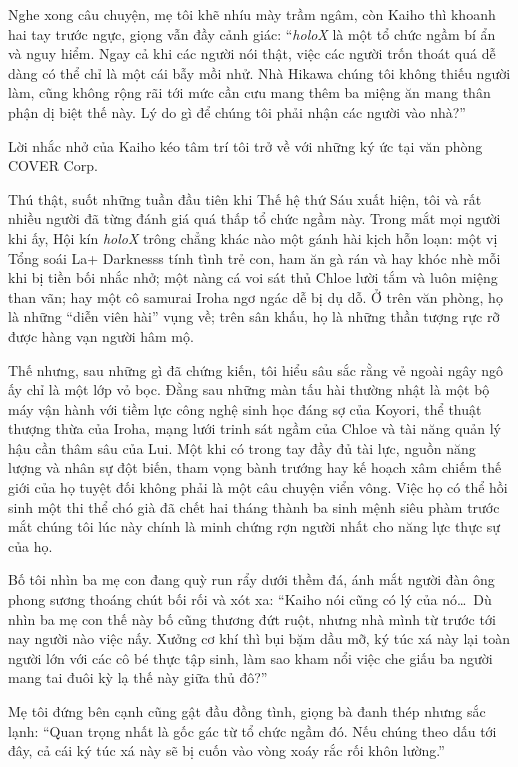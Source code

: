 \documentclass[../main.tex]{subfiles}
\begin{document}
Nghe xong câu chuyện, mẹ tôi khẽ nhíu mày trầm ngâm, còn Kaiho thì khoanh hai tay trước ngực, giọng vẫn đầy cảnh giác: ``\textit{holoX} là một tổ chức ngầm bí ẩn và nguy hiểm. Ngay cả khi các người nói thật, việc các người trốn thoát quá dễ dàng có thể chỉ là một cái bẫy mồi nhử. Nhà Hikawa chúng tôi không thiếu người làm, cũng không rộng rãi tới mức cần cưu mang thêm ba miệng ăn mang thân phận dị biệt thế này. Lý do gì để chúng tôi phải nhận các người vào nhà?''

Lời nhắc nhở của Kaiho kéo tâm trí tôi trở về với những ký ức tại văn phòng COVER Corp.

Thú thật, suốt những tuần đầu tiên khi Thế hệ thứ Sáu xuất hiện, tôi và rất nhiều người đã từng đánh giá quá thấp tổ chức ngầm này. Trong mắt mọi người khi ấy, Hội kín \textit{holoX} trông chẳng khác nào một gánh hài kịch hỗn loạn: một vị Tổng soái La+ Darknesss tính tình trẻ con, ham ăn gà rán và hay khóc nhè mỗi khi bị tiền bối nhắc nhở; một nàng cá voi sát thủ Chloe lười tắm và luôn miệng than vãn; hay một cô samurai Iroha ngơ ngác dễ bị dụ dỗ. Ở trên văn phòng, họ là những ``diễn viên hài'' vụng về; trên sân khấu, họ là những thần tượng rực rỡ được hàng vạn người hâm mộ.

Thế nhưng, sau những gì đã chứng kiến, tôi hiểu sâu sắc rằng vẻ ngoài ngây ngô ấy chỉ là một lớp vỏ bọc. Đằng sau những màn tấu hài thường nhật là một bộ máy vận hành với tiềm lực công nghệ sinh học đáng sợ của Koyori, thể thuật thượng thừa của Iroha, mạng lưới trinh sát ngầm của Chloe và tài năng quản lý hậu cần thâm sâu của Lui. Một khi có trong tay đầy đủ tài lực, nguồn năng lượng và nhân sự đột biến, tham vọng bành trướng hay kế hoạch xâm chiếm thế giới của họ tuyệt đối không phải là một câu chuyện viển vông. Việc họ có thể hồi sinh một thi thể chó già đã chết hai tháng thành ba sinh mệnh siêu phàm trước mắt chúng tôi lúc này chính là minh chứng rợn người nhất cho năng lực thực sự của họ.

Bố tôi nhìn ba mẹ con đang quỳ run rẩy dưới thềm đá, ánh mắt người đàn ông phong sương thoáng chút bối rối và xót xa: ``Kaiho nói cũng có lý của nó\dots\ Dù nhìn ba mẹ con thế này bố cũng thương đứt ruột, nhưng nhà mình từ trước tới nay người nào việc nấy. Xưởng cơ khí thì bụi bặm dầu mỡ, ký túc xá này lại toàn người lớn với các cô bé thực tập sinh, làm sao kham nổi việc che giấu ba người mang tai đuôi kỳ lạ thế này giữa thủ đô?''

Mẹ tôi đứng bên cạnh cũng gật đầu đồng tình, giọng bà đanh thép nhưng sắc lạnh: ``Quan trọng nhất là gốc gác từ tổ chức ngầm đó. Nếu chúng theo dấu tới đây, cả cái ký túc xá này sẽ bị cuốn vào vòng xoáy rắc rối khôn lường.''
\end{document}
